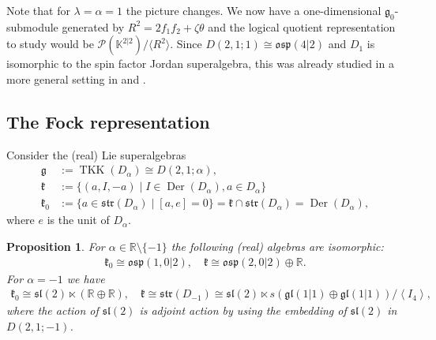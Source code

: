 \documentclass{amsart}
\newtheorem{Prop}[theorem]{Proposition}
\numberwithin{theorem}{section}
\theoremstyle{definition}
\theoremstyle{remark}
\def\R{\mathds{R} }
\DeclareMathOperator{\TKK}{TKK}
\newcommand{\mf}[1]{\mathfrak{#1}}
\newcommand{\ds}[1]{\mathds{#1}}
\newcommand{\mc}[1]{\mathcal{#1}}
\newcommand{\mg}{{\mathfrak{g}}}
\DeclareMathOperator{\Der}{Der}
\begin{document}
Note that for $\lambda=\alpha=1$ the picture changes. We now have a one-dimensional $\mg_0$-submodule generated by $R^2=2f_1f_2+\zeta\theta$ and the logical quotient representation to study would be $\mc{P} (\mathds{K}^{2 |2}) / \langle R^2\rangle$. Since $D(2,1;1) \cong \mf{osp}(4|2)$ and $D_1$ is isomorphic to the spin factor Jordan superalgebra, this was already studied in a more general setting in \cite{BF} and \cite{BCD}.

\subsection{The Fock representation}\label{Section Cayley}

Consider the (real) Lie superalgebras
\begin{align*}
\mathfrak{g}&:= \TKK(D_{\alpha}) \cong D(2,1;\alpha),\\
\mf k &:= \{(a, I, -a) \mid I \in \Der(D_\alpha), a\in D_\alpha\}\\
\mf k_{0} &:= \{a\in \mf{str}(D_\alpha) \mid [a,e] = 0\} = \mf k\cap \mf{str}(D_\alpha) = \Der(D_\alpha), 
\end{align*}
where $e$ is the unit of $D_\alpha$.
\begin{Prop}
For $\alpha \in \ds R\setminus \{-1\}$ the following (real) algebras are isomorphic:
\begin{align*}
\mf k_0 \cong \mf{osp}(1,0|2), \quad \mf k \cong \mf{osp}(2,0|2)\oplus \R.
\end{align*}
For $\alpha = -1$ we have
\begin{align*}
\mf k_0 \cong \mf{sl}(2)\ltimes (\R\oplus\R), \quad \mf k \cong \mf{str}(D_{-1}) \cong \mf{sl}(2)\ltimes s(\mf{gl}(1|1)\oplus\mf{gl}(1|1))/\left<I_4\right>,
\end{align*}
where the action of $\mf{sl}(2)$ is adjoint action by using the embedding of $\mf{sl}(2)$ in $D(2,1;-1)$.
\end{Prop}
\end{document}
